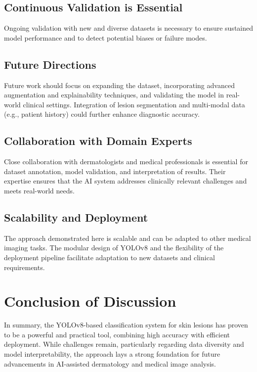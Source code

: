 \documentclass[a4paper,12pt]{report}
\begin{document}
\begin{spacing}{1.5}
        \subsection*{Continuous Validation is Essential}
        Ongoing validation with new and diverse datasets is necessary to ensure sustained model performance and to detect potential biases or failure modes.
        
        \subsection*{Future Directions}
        Future work should focus on expanding the dataset, incorporating advanced augmentation and explainability techniques, and validating the model in real-world clinical settings. Integration of lesion segmentation and multi-modal data (e.g., patient history) could further enhance diagnostic accuracy.
        
        \subsection*{Collaboration with Domain Experts}
        Close collaboration with dermatologists and medical professionals is essential for dataset annotation, model validation, and interpretation of results. Their expertise ensures that the AI system addresses clinically relevant challenges and meets real-world needs.
        
        \subsection*{Scalability and Deployment}
        The approach demonstrated here is scalable and can be adapted to other medical imaging tasks. The modular design of YOLOv8 and the flexibility of the deployment pipeline facilitate adaptation to new datasets and clinical requirements.
    
    \section*{Conclusion of Discussion}
    In summary, the YOLOv8-based classification system for skin lesions has proven to be a powerful and practical tool, combining high accuracy with efficient deployment. While challenges remain, particularly regarding data diversity and model interpretability, the approach lays a strong foundation for future advancements in AI-assisted dermatology and medical image analysis.


\end{spacing}
\end{document}
